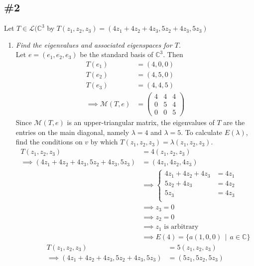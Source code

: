 \documentclass[12pt]{article}
\newcommand{\suchthat}{\, \mid \,}
\begin{document}
\subsection*{\#2}
{Let $T \in \mathcal{L}(\mathbb{C}^3$ by $T(z_1, z_2, z_3) = (4z_1 + 4z_2 + 4z_3, 5z_2 + 4z_3, 5z_3)$}
\begin{enumerate}[\ \ \it(a)\ \ ]
	\item {\it Find the eigenvalues and associated eigenspaces for $T$.} \\

	\noindent Let $e = (e_1, e_2, e_3)$ be the standard basis of $\mathbb{C}^3$.  Then
	\begin{align*}
		T(e_1) &= (4, 0, 0) \\
		T(e_2) &= (4, 5, 0) \\
		T(e_3) &= (4, 4, 5) \\
		\implies \mathcal{M}(T, e) &= \left(\begin{array}{ccc}
		4 & 4 & 4 \\
		0 & 5 & 4 \\
		0 & 0 & 5
		\end{array}\right)
	\end{align*}
	Since $\mathcal{M}(T, e)$ is an upper-triangular matrix, the eigenvalues of $T$ are the entries on the main diagonal, namely $\lambda = 4$ and $\lambda = 5$.  To calculate $E(\lambda)$, find the conditions on $v$ by which $T(z_1, z_2, z_3) = \lambda (z_1, z_2, z_3)$.
	\begin{align*}
		T(z_1, z_2, z_3) &= 4(z_1, z_2, z_3) \\
		\implies (4z_1 + 4z_2 + 4z_3, 5z_2 + 4z_3, 5z_3) &= (4z_1, 4z_2, 4z_3) \\
		&\implies \left\{\begin{array}{rl}
			4z_1 + 4z_2 + 4z_3 &= 4z_1 \\
			5z_2 + 4z_3 &= 4z_2 \\
			5z_3 &= 4z_3 \\
		\end{array}\right. \\
		&\implies z_3 = 0 \\
		&\implies z_2 = 0 \\
		&\implies z_1 \text{ is arbitrary} \\
		&\implies E(4) = \{a(1, 0, 0) \suchthat a \in \mathbb{C}\}
	\end{align*}
	\begin{align*}
		T(z_1, z_2, z_3) &= 5(z_1, z_2, z_3) \\
		\implies (4z_1 + 4z_2 + 4z_3, 5z_2 + 4z_3, 5z_3) &= (5z_1, 5z_2, 5z_3) \\

\end{align*}
\end{enumerate}
\end{document}
